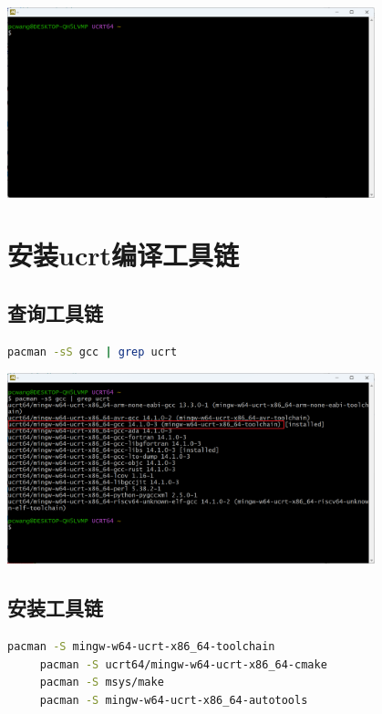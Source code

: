 \begin{center}
	\includegraphics[width=0.8\textwidth]{03install/msys2_ucrt.png}
\end{center}

\section{安装ucrt编译工具链}

\subsection{查询工具链}

\begin{lstlisting}[language=bash]
	pacman -sS gcc | grep ucrt
\end{lstlisting}

\begin{center}
	\includegraphics[width=0.8\textwidth]{03install/pacman_search_ucrt_gcc.png}
\end{center}

\subsection{安装工具链}

\begin{lstlisting}[language=bash]
	 pacman -S mingw-w64-ucrt-x86_64-toolchain
	 pacman -S ucrt64/mingw-w64-ucrt-x86_64-cmake 
	 pacman -S msys/make
	 pacman -S mingw-w64-ucrt-x86_64-autotools
\end{lstlisting}


